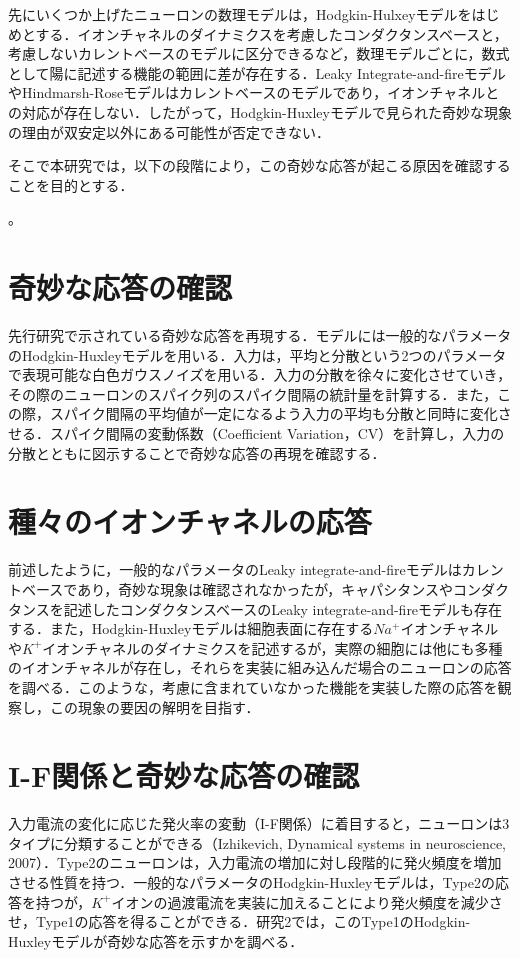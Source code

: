 \documentclass[dvipdfmx, A4j, twocolumn, 10.5pt]{jsarticle}
\begin{document}
先にいくつか上げたニューロンの数理モデルは，Hodgkin-Hulxeyモデルをはじめとする．イオンチャネルのダイナミクスを考慮したコンダクタンスベースと，考慮しないカレントベースのモデルに区分できるなど，数理モデルごとに，数式として陽に記述する機能の範囲に差が存在する．Leaky Integrate-and-fireモデルやHindmarsh-Roseモデルはカレントベースのモデルであり，イオンチャネルとの対応が存在しない．したがって，Hodgkin-Huxleyモデルで見られた奇妙な現象の理由が双安定以外にある可能性が否定できない．


そこで本研究では，以下の段階により，この奇妙な応答が起こる原因を確認することを目的とする．

\cite{lite2}。

\section{奇妙な応答の確認}
先行研究で示されている奇妙な応答を再現する．モデルには一般的なパラメータのHodgkin-Huxleyモデルを用いる．入力は，平均と分散という2つのパラメータで表現可能な白色ガウスノイズを用いる．入力の分散を徐々に変化させていき，その際のニューロンのスパイク列のスパイク間隔の統計量を計算する．また，この際，スパイク間隔の平均値が一定になるよう入力の平均も分散と同時に変化させる．スパイク間隔の変動係数（Coefficient Variation，CV）を計算し，入力の分散とともに図示することで奇妙な応答の再現を確認する．

\vspace{\baselineskip}

\section{種々のイオンチャネルの応答}
前述したように，一般的なパラメータのLeaky integrate-and-fireモデルはカレントベースであり，奇妙な現象は確認されなかったが，キャパシタンスやコンダクタンスを記述したコンダクタンスベースのLeaky integrate-and-fireモデルも存在する．また，Hodgkin-Huxleyモデルは細胞表面に存在する$Na^{+}$イオンチャネルや$K^{+}$イオンチャネルのダイナミクスを記述するが，実際の細胞には他にも多種のイオンチャネルが存在し，それらを実装に組み込んだ場合のニューロンの応答を調べる．このような，考慮に含まれていなかった機能を実装した際の応答を観察し，この現象の要因の解明を目指す．

\iffalse
\section{I-F関係と奇妙な応答の確認}
入力電流の変化に応じた発火率の変動（I-F関係）に着目すると，ニューロンは3タイプに分類することができる（Izhikevich, Dynamical systems in neuroscience, 2007）．Type2のニューロンは，入力電流の増加に対し段階的に発火頻度を増加させる性質を持つ．一般的なパラメータのHodgkin-Huxleyモデルは，Type2の応答を持つが，$K^{+}$イオンの過渡電流を実装に加えることにより発火頻度を減少させ，Type1の応答を得ることができる．研究2では，このType1のHodgkin-Huxleyモデルが奇妙な応答を示すかを調べる．
\end{document}

